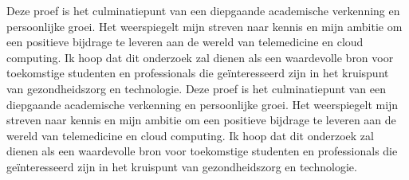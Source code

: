 Deze proef is het culminatiepunt van een diepgaande academische verkenning en persoonlijke groei. Het weerspiegelt mijn streven naar kennis en mijn ambitie om een positieve bijdrage te leveren aan de wereld van telemedicine en cloud computing. Ik hoop dat dit onderzoek zal dienen als een waardevolle bron voor toekomstige studenten en professionals die geïnteresseerd zijn in het kruispunt van gezondheidszorg en technologie.
Deze proef is het culminatiepunt van een diepgaande academische verkenning en persoonlijke groei. Het weerspiegelt mijn streven naar kennis en mijn ambitie om een positieve bijdrage te leveren aan de wereld van telemedicine en cloud computing. Ik hoop dat dit onderzoek zal dienen als een waardevolle bron voor toekomstige studenten en professionals die geïnteresseerd zijn in het kruispunt van gezondheidszorg en technologie.


    